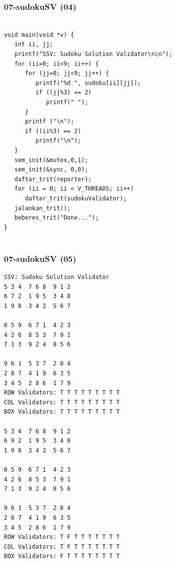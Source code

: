 \documentclass[aspectratio=169, xcolor=table, notheorems, hyperref={pdfpagelabels=false}]{beamer}
\begin{document}
\begin{frame}[fragile]
\frametitle{07-sudokuSV (04)}
\begin{lstlisting}[basicstyle=\ttfamily\tiny]

void main(void *v) {
   int ii, jj;
   printf("SSV: Sudoku Solution Validator\n\n");
   for (ii=0; ii<9; ii++) {
      for (jj=0; jj<9; jj++) {
         printf("%d ", sudoku[ii][jj]);
         if ((jj%3) == 2)
            printf(" ");
      }
      printf ("\n");
      if ((ii%3) == 2)
         printf("\n");
   }
   sem_init(&mutex,0,1);
   sem_init(&sync, 0,0); 
   daftar_trit(reporter);
   for (ii = 0; ii < V_THREADS; ii++)
      daftar_trit(sudokuValidator);
   jalankan_trit();
   beberes_trit("Done...");
}


\end{lstlisting}
\end{frame}

\begin{frame}[fragile]
\frametitle{07-sudokuSV (05)}
\begin{lstlisting}[basicstyle=\ttfamily\tiny]
SSV: Sudoku Solution Validator
5 3 4  7 6 8  9 1 2  
6 7 2  1 9 5  3 4 8  
1 9 8  3 4 2  5 6 7  

8 5 9  6 7 1  4 2 3  
4 2 6  8 5 3  7 9 1  
7 1 3  9 2 4  8 5 6  

9 6 1  5 3 7  2 8 4  
2 8 7  4 1 9  6 3 5  
3 4 5  2 8 6  1 7 9  
ROW Validators: T T T T T T T T T 
COL Validators: T T T T T T T T T 
BOX Validators: T T T T T T T T T 

5 3 4  7 6 8  9 1 2  
6 9 2  1 9 5  3 4 8  
1 9 8  3 4 2  5 6 7  

8 5 9  6 7 1  4 2 3  
4 2 6  8 5 3  7 9 1  
7 1 3  9 2 4  8 5 6  

9 6 1  5 3 7  2 8 4  
2 8 7  4 1 9  6 3 5  
3 4 5  2 8 6  1 7 9  
ROW Validators: T F T T T T T T T 
COL Validators: T F T T T T T T T 
BOX Validators: F T T T T T T T T 

\end{lstlisting}
\end{frame}
\end{document}
